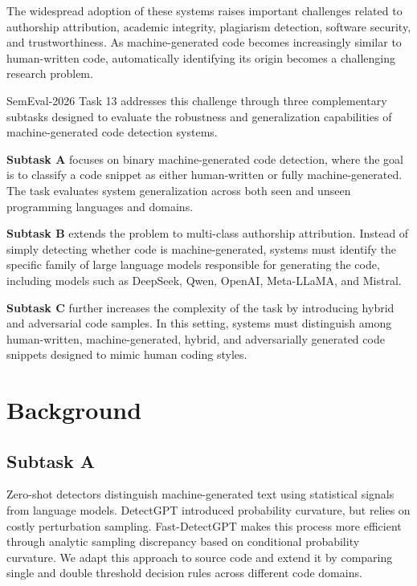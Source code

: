 \documentclass[11pt]{article}
\begin{document}
The widespread adoption of these systems raises important challenges related to authorship attribution, academic integrity, plagiarism detection, software security, and trustworthiness. As machine-generated code becomes increasingly similar to human-written code, automatically identifying its origin becomes a challenging research problem.

SemEval-2026 Task 13 addresses this challenge through three complementary subtasks designed to evaluate the robustness and generalization capabilities of machine-generated code detection systems.


\textbf{Subtask A} focuses on binary machine-generated code detection, where the goal is to classify a code snippet as either human-written or fully machine-generated. The task evaluates system generalization across both seen and unseen programming languages and domains.

\textbf{Subtask B} extends the problem to multi-class authorship attribution. Instead of simply detecting whether code is machine-generated, systems must identify the specific family of large language models responsible for generating the code, including models such as DeepSeek, Qwen, OpenAI, Meta-LLaMA, and Mistral.

\textbf{Subtask C} further increases the complexity of the task by introducing hybrid and adversarial code samples. In this setting, systems must distinguish among human-written, machine-generated, hybrid, and adversarially generated code snippets designed to mimic human coding styles.


\section{Background}

\subsection{ Subtask A}

Zero-shot detectors distinguish machine-generated text using statistical signals from language models. DetectGPT \cite{mitchell2023detectgptzeroshotmachinegeneratedtext} introduced probability curvature, but relies on costly perturbation sampling. Fast-DetectGPT \cite{bao2024fastdetectgptefficientzeroshotdetection} makes this process more efficient through analytic sampling discrepancy based on conditional probability curvature. We adapt this approach to source code and extend it by comparing single and double threshold decision rules across different code domains.
\end{document}
